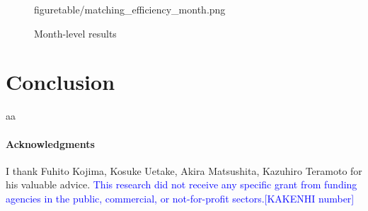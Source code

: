 \documentclass[12pt]{article}
\begin{document}
\begin{figure}[!ht]
\begin{center}
{  {figuretable/matching_efficiency_month.png}}
  \\
  \caption{Month-level results}
  \label{fg:month_level_results} 
  \end{center}
  \footnotesize
\end{figure} 


\section{Conclusion}

aa


\paragraph{Acknowledgments}
I thank Fuhito Kojima, Kosuke Uetake, Akira Matsushita, Kazuhiro Teramoto for his valuable advice. \textcolor{blue}{This research did not receive any specific grant from funding agencies in the public, commercial, or not-for-profit sectors.[KAKENHI number]}





\end{document}
